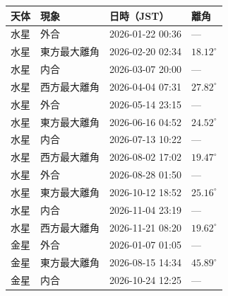 \begin{tabular}{llll}
\toprule
天体 & 現象 & 日時（JST） & 離角 \\
\midrule
水星 & 外合 & 2026-01-22 00:36 & --- \\
水星 & 東方最大離角 & 2026-02-20 02:34 & $18.12^\circ$ \\
水星 & 内合 & 2026-03-07 20:00 & --- \\
水星 & 西方最大離角 & 2026-04-04 07:31 & $27.82^\circ$ \\
水星 & 外合 & 2026-05-14 23:15 & --- \\
水星 & 東方最大離角 & 2026-06-16 04:52 & $24.52^\circ$ \\
水星 & 内合 & 2026-07-13 10:22 & --- \\
水星 & 西方最大離角 & 2026-08-02 17:02 & $19.47^\circ$ \\
水星 & 外合 & 2026-08-28 01:50 & --- \\
水星 & 東方最大離角 & 2026-10-12 18:52 & $25.16^\circ$ \\
水星 & 内合 & 2026-11-04 23:19 & --- \\
水星 & 西方最大離角 & 2026-11-21 08:20 & $19.62^\circ$ \\
\midrule
金星 & 外合 & 2026-01-07 01:05 & --- \\
金星 & 東方最大離角 & 2026-08-15 14:34 & $45.89^\circ$ \\
金星 & 内合 & 2026-10-24 12:25 & --- \\
\bottomrule
\end{tabular}
